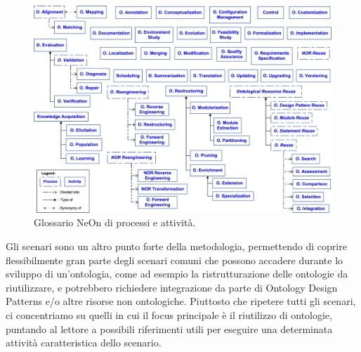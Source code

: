 \begin{figure}
	\centering
	\includegraphics[scale=0.8]{pictures/NeOn-Glossary.jpg}
	\caption{Glossario NeOn \cite{NeOn} di processi e attività.}
	\label{fig:NeONglossary}
\end{figure}

Gli scenari sono un altro punto forte della metodologia, permettendo di coprire flessibilmente gran parte degli scenari comuni che possono accadere durante lo sviluppo di un'ontologia, come ad esempio la ristrutturazione delle ontologie da riutilizzare, e potrebbero richiedere integrazione da parte di Ontology Design Patterns \cite{ODP} e/o altre risorse non ontologiche. Piuttosto che ripetere tutti gli scenari, ci concentriamo su quelli in cui il focus principale è il riutilizzo di ontologie, puntando al lettore a possibili riferimenti utili per eseguire una determinata attività caratteristica dello scenario.
